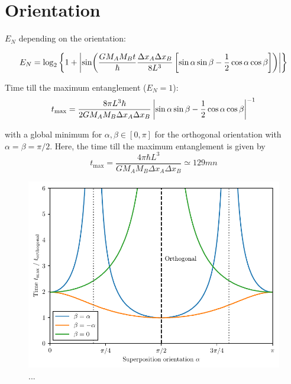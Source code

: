 \section{Orientation}
$E_N$ depending on the orientation:

\begin{equation}
  E_N = \log_2\left\{
    1 + \left\lvert
      \sin(
      \frac{G M_A M_B t}{\hbar} \frac{\Delta x_A \Delta x_B}{8L^3}
      \left[ \sin\alpha\sin\beta - \frac{1}{2}\cos\alpha\cos\beta \right]
      )
      \right\rvert
  \right\}
\end{equation}

Time till the maximum entanglement ($E_N = 1$):
\begin{equation}
  t_\mathrm{max} = \frac{8 \pi L^3 \hbar}{2 G M_A M_B \Delta x_A\Delta x_B} \left\lvert\sin\alpha\sin\beta - \frac{1}{2}\cos\alpha\cos\beta\right\rvert^{-1}
\end{equation}

with a global minimum for $\alpha,\beta \in [0, \pi]$ for the orthogonal orientation with $\alpha = \beta = \pi/2$. Here, the time till the maximum entanglement is given by
\begin{equation}
  t_\mathrm{max} = \frac{4 \pi \hbar L^3}{G M_A M_B \Delta x_A \Delta x_B} \simeq 129\si{mn}
\end{equation}

\begin{figure}[!htbp]
  \centering
  \includegraphics[width=\textwidth]{./../figures/ideal-entanglement/EN-orientation.pdf}
  \caption{...}
  \label{fig:5:optimal-orientation}
\end{figure}